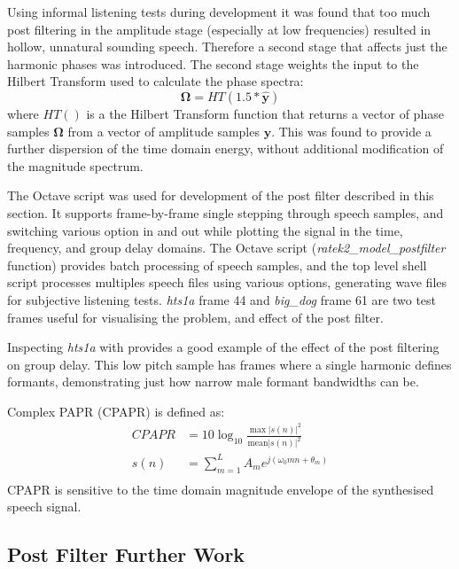 \documentclass{article}
\begin{document}
Using informal listening tests during development it was found that too much post filtering in the amplitude stage (especially at low frequencies) resulted in hollow, unnatural sounding speech.  Therefore a second stage that affects just the harmonic phases was introduced. The second stage weights the input to the Hilbert Transform used to calculate the phase spectra:
\begin{equation}
\mathbf{\Omega}=HT(1.5*\hat{\mathbf{y}})
\end{equation}
where $HT()$ is a the Hilbert Transform function that returns a vector of phase samples $\mathbf{\Omega}$ from a vector of amplitude samples $\mathbf{y}$.  This was found to provide a further dispersion of the time domain energy, without additional modification of the magnitude spectrum.

The  Octave script was used for development of the post filter described in this section.  It supports frame-by-frame single stepping through speech samples, and switching various option in and out while plotting the signal in the time, frequency, and group delay domains.  The  Octave script (\emph{ratek2\_model\_postfilter} function) provides batch processing of speech samples, and the top level  shell script processes multiples speech files using various options, generating wave files for subjective listening tests. \emph{hts1a} frame 44 and \emph{big\_dog} frame 61 are two test frames useful for visualising the problem, and effect of the post filter.  

Inspecting \emph{hts1a} with  provides a good example of the effect of the post filtering on group delay.  This low pitch sample has frames where a single harmonic defines formants, demonstrating just how narrow male formant bandwidths can be.

Complex PAPR (CPAPR) is defined as:
\begin{equation}
\begin{split}
CPAPR &= 10\log_{10} \frac{ \max |s(n)|^2 }{ \textrm{mean} |s(n)|^2 } \\
s(n) &= \sum_{m=1}^{L}A_m e^{j(\omega_0mn+\theta_m)} \\
\end{split}
\end{equation}
CPAPR is sensitive to the time domain magnitude envelope of the synthesised speech signal.

\subsection{Post Filter Further Work}
\label{section:postfilter_futher}
\end{document}
